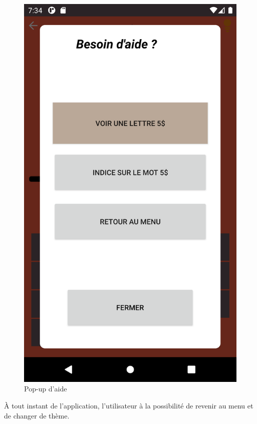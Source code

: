 \documentclass{article}
\begin{document}
\begin{figure}[h!]
\color{black}
\centering
\includegraphics[scale=0.06]{aide.png}
\caption{Pop-up d'aide }
\label{fig:aide}
\end{figure}

À tout instant de l'application, l'utilisateur à la possibilité de revenir au menu et de changer de thème.

\newpage
\end{document}
